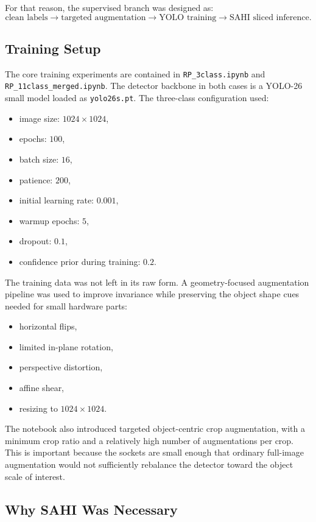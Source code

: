 \documentclass[11pt,a4paper]{article}
\begin{document}
For that reason, the supervised branch was designed as:
\[
\text{clean labels} \rightarrow \text{targeted augmentation} \rightarrow \text{YOLO training} \rightarrow \text{SAHI sliced inference}.
\]

\subsection{Training Setup}

The core training experiments are contained in \texttt{RP\_3class.ipynb} and \texttt{RP\_11class\_merged.ipynb}. The detector backbone in both cases is a YOLO-26 small model loaded as \texttt{yolo26s.pt}. The three-class configuration used:
\begin{itemize}[leftmargin=1.5em]
  \item image size: \(1024 \times 1024\),
  \item epochs: \(100\),
  \item batch size: \(16\),
  \item patience: \(200\),
  \item initial learning rate: \(0.001\),
  \item warmup epochs: \(5\),
  \item dropout: \(0.1\),
  \item confidence prior during training: \(0.2\).
\end{itemize}

The training data was not left in its raw form. A geometry-focused augmentation pipeline was used to improve invariance while preserving the object shape cues needed for small hardware parts:
\begin{itemize}[leftmargin=1.5em]
  \item horizontal flips,
  \item limited in-plane rotation,
  \item perspective distortion,
  \item affine shear,
  \item resizing to \(1024 \times 1024\).
\end{itemize}

The notebook also introduced targeted object-centric crop augmentation, with a minimum crop ratio and a relatively high number of augmentations per crop. This is important because the sockets are small enough that ordinary full-image augmentation would not sufficiently rebalance the detector toward the object scale of interest.

\subsection{Why SAHI Was Necessary}
\end{document}
